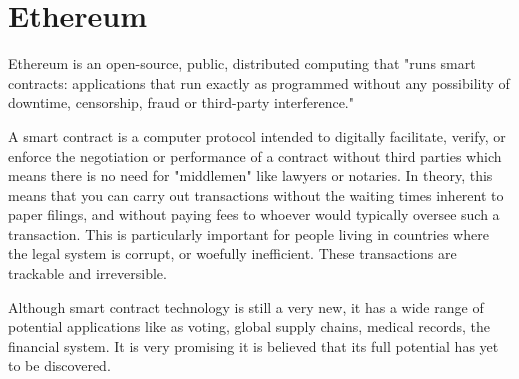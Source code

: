 \section{Ethereum}

Ethereum  is an open-source, public,  distributed computing that "runs smart contracts: applications that run exactly as programmed without any possibility of downtime, censorship, fraud or third-party interference."   \cite{EthereumOrg}

A smart contract is a computer protocol intended to digitally facilitate, verify, or enforce the negotiation or performance of a contract without third parties which means there is no need for "middlemen" like lawyers or notaries. In theory, this means that you can carry out transactions without the waiting times inherent to paper filings, and without paying fees to whoever would typically oversee such a transaction. This is particularly important for people living in countries where the legal system is corrupt, or woefully inefficient. These transactions are trackable and irreversible.

Although smart contract technology is still a very new, it has a wide range of potential applications like as voting, global supply chains, medical records, the financial system. It is very promising it is believed that its full potential has yet to be discovered.
